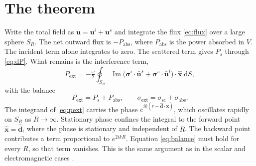 \documentclass[11pt,a4paper]{article}
\newcommand{\bx}{\mathbf{x}}
\newcommand{\dd}{\mathrm{d}}
\newcommand{\bu}{\mathbf{u}}
\newcommand{\bd}{\hat{\mathbf{d}}}
\newcommand{\xh}{\hat{\mathbf{x}}}
\newcommand{\bsig}{\boldsymbol{\sigma}}
\newcommand{\sext}{\sigma_{\mathrm{ext}}}
\newcommand{\ssc}{\sigma_{\mathrm{sc}}}
\newcommand{\sabs}{\sigma_{\mathrm{abs}}}
\DeclareMathOperator{\Imag}{Im}
\begin{document}
\section{The theorem}
\label{sec:theorem}

Write the total field as $\bu = \bu^i + \bu^s$ and integrate the flux
\eqref{eq:flux} over a large sphere $S_R$. The net outward flux is
$-P_{\mathrm{abs}}$, where $P_{\mathrm{abs}}$ is the power absorbed in $V$.
The incident term alone integrates to zero. The scattered term gives
$P_s$ through \eqref{eq:dP}. What remains is the interference term,
\begin{equation}
  P_{\mathrm{ext}}
  = -\tfrac{\omega}{2}\oint_{S_R}
     \Imag\bigl(\bsig^{i}\cdot\bar{\bu}^{s}
               + \bsig^{s}\cdot\bar{\bu}^{i}\bigr)\cdot\xh\;\dd S ,
  \label{eq:pext}
\end{equation}
with the balance
\begin{equation}
  P_{\mathrm{ext}} = P_{s} + P_{\mathrm{abs}}, \qquad
  \sext = \ssc + \sabs .
  \label{eq:balance}
\end{equation}
The integrand of \eqref{eq:pext} carries the phase
$e^{ik(r - \bd\cdot\bx)}$, which oscillates rapidly on $S_R$ as
$R\to\infty$. Stationary phase \citep{MorseFeshbach1953} confines
the integral to the forward point $\xh = \bd$, where the phase is
stationary and independent of $R$. The backward point contributes a term
proportional to $e^{2ikR}$. Equation \eqref{eq:balance} must hold for every
$R$, so that term vanishes. This is the same argument as in the scalar
and electromagnetic cases \citep{Newton1976,BohrenHuffman1983}.
\end{document}
